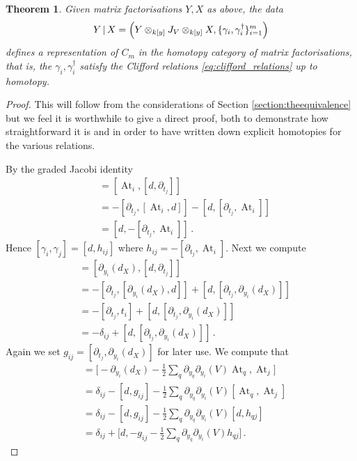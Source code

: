 \documentclass[english,letter paper,12pt,leqno]{article}
\newtheorem{theorem}{Theorem}[section]
\theoremstyle{example}
\numberwithin{equation}{section}
\def\be{\begin{equation}}
\def\ee{\end{equation}}
\def\ferm{\gamma}
\def\fermc{\gamma^\dagger}
\DeclareMathOperator{\At}{At}
\begin{document}
\begin{theorem}\label{theorem:cut_is_rep} Given matrix factorisations $Y,X$ as above, the data
\be
Y \l X = \left( Y \otimes_{k[y]} J_V \otimes_{k[y]} X, \{ \ferm_i, \fermc_i \}_{i=1}^m \right)
\ee
defines a representation of $C_m$ in the homotopy category of matrix factorisations, that is, the $\ferm_i, \fermc_i$ satisfy the Clifford relations \eqref{eq:clifford_relations}
up to homotopy.
\end{theorem}
\begin{proof}
This will follow from the considerations of Section \ref{section:theequivalence} but we feel it is worthwhile to give a direct proof, both to demonstrate how straightforward it is and in order to have written down explicit homotopies for the various relations.

By the graded Jacobi identity
\begin{align*}
[\At_i, \At_j] &= [\At_i, [d, \partial_{t_j}]]\\
&= - [\partial_{t_j}, [\At_i, d]] - [d, [\partial_{t_j}, \At_i]]\\
&= [d, -[\partial_{t_j}, \At_i]]\,.
\end{align*}
Hence $[\ferm_i, \ferm_j] = [d, h_{ij}]$ where $h_{ij} = - [ \partial_{t_j}, \At_i ]$. Next we compute
\begin{align*}
[\partial_{y_i}(d_X), \At_j] &= [\partial_{y_i}(d_X), [d, \partial_{t_j}]]\\
&= -[\partial_{t_j}, [\partial_{y_i}(d_X), d]] + [d, [\partial_{t_j}, \partial_{y_i}(d_X)]]\\
&= -[\partial_{t_j}, t_i] + [d, [\partial_{t_j}, \partial_{y_i}(d_X)]]\\
&= -\delta_{ij} + [d, [\partial_{t_j}, \partial_{y_i}(d_X)]]\,.
\end{align*}
Again we set $g_{ij} = [\partial_{t_j}, \partial_{y_i}(d_X)]$ for later use. We compute that
\begin{align*}
[ \fermc_i, \ferm_j] &= \big[- \partial_{y_i}(d_X) - \frac{1}{2} \sum_q \partial_{y_q} \partial_{y_i}(V) \At_{q}, \At_j \big]\\
&= \delta_{ij} - [d, g_{ij}] - \frac{1}{2} \sum_q \partial_{y_q} \partial_{y_i}(V) [ \At_q, \At_j]\\
&= \delta_{ij} - [d, g_{ij}] - \frac{1}{2} \sum_q \partial_{y_q} \partial_{y_i}(V) [d, h_{qj}]\\
&= \delta_{ij} + \big[d, -g_{ij} - \frac{1}{2} \sum_q \partial_{y_q} \partial_{y_i}(V) h_{qj}\big]\,.
\end{align*}

\end{proof}
\end{document}
